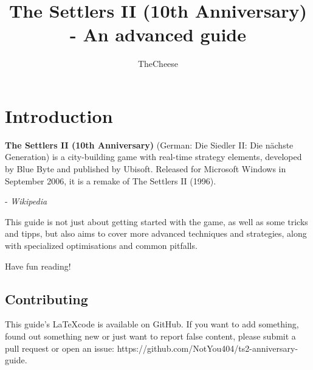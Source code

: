 \documentclass{article}
\title{The Settlers II (10th Anniversary) - An advanced guide}
\author{TheCheese}
\date{}
\begin{document}
\maketitle

\vspace{2cm}

\tableofcontents

\section{Introduction}

\begin{displayquote}
\textbf{The Settlers II (10th Anniversary)} (German: Die Siedler II: Die nächste Generation) is a city-building game with real-time strategy elements, developed by Blue Byte and published by Ubisoft. Released for Microsoft Windows in September 2006, it is a remake of The Settlers II (1996).
\end{displayquote}
\hspace{2cm}- \textit{Wikipedia}

This guide is not just about getting started with the game, as well as some tricks and tipps, but also aims to cover more advanced techniques and strategies, along with specialized optimisations and common pitfalls.

Have fun reading!

\subsection{Contributing}

This guide's \LaTeX code is available on GitHub. If you want to add something, found out something new or just want to report false content, please submit a pull request or open an issue: https://github.com/NotYou404/ts2-anniversary-guide.
\end{document}
